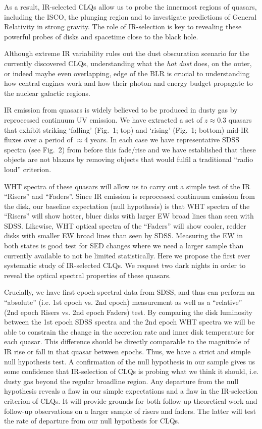 \documentclass[a4paper,fleqn,usenatbib]{mnras}
\begin{document}
As a result, IR-selected CLQs \citep{Graham2019} allow us to
probe the innermost regions of quasars, including the ISCO, the
plunging region and to investigate predictions of General Relativity
in strong gravity. The role of IR-selection is key to revealing these
powerful probes of disks and spacetime close to the black hole.

Although extreme IR variability rules out the dust obscuration
scenario for the currently discovered CLQs, understanding what the
{\it hot dust} does, on the outer, or indeed maybe even overlapping,
edge of the BLR is crucial to understanding how central engines work
and how their photon and energy budget propagate to the nuclear
galactic regions. 

IR emission from quasars is widely believed to be produced in dusty
gas by reprocessed continuum UV emission. We have extracted a set of
$z\approx 0.3$ quasars that exhibit striking `falling' (Fig.~1; top)
and `rising' (Fig.~1; bottom) mid-IR fluxes over a period of
$\approx$4 years. In each case we have representative SDSS spectra
(see Fig.~2) from before this fade/rise and we have established that
these objects are not blazars by removing objects that would fulfil a
traditional ``radio loud'' criterion.

WHT spectra of these quasars will allow us to carry out a simple test
of the IR ``Risers'' and ``Faders''. Since IR emission is reprocessed
continuum emission from the disk, our baseline expectation (null
hypothesis) is that WHT spectra of the ``Risers'' will show hotter,
bluer disks with larger EW broad lines than seen with SDSS. Likewise,
WHT optical spectra of the ``Faders'' will show cooler, redder disks
with smaller EW broad lines than seen by SDSS. Measuring the EW in
both states is good test for SED changes where we need a larger sample
than currently available to not be limited statistically. Here we
propose the first ever systematic study of IR-selected CLQs.  We
request two dark nights in order to reveal the optical spectral
properties of these quasars.

Crucially, we have first epoch spectral data from SDSS, and thus can
perform an ``absolute'' (i.e. 1st epoch vs. 2nd epoch) measurement as
well as a ``relative'' (2nd epoch Risers vs. 2nd epoch Faders)
test. By comparing the disk luminosity between the 1st epoch SDSS
spectra and the 2nd epoch WHT spectra we will be able to constrain the
change in the accretion rate and inner disk temperature for each
quasar. This difference should be directly comparable to the magnitude
of IR rise or fall in that quasar between epochs.  Thus, we have a
strict and simple null hypothesis test. A confirmation of the null
hypothesis in our sample gives us some confidence that IR-selection of
CLQs is probing what we think it should, i.e. dusty gas beyond the
regular broadline region. Any departure from the null hypothesis
reveals a flaw in our simple expectations and a flaw in the
IR-selection criterion of CLQs. It will provide grounds for both
follow-up theoretical work and follow-up observations on a larger
sample of risers and faders. The latter will test the rate of
departure from our null hypothesis for CLQs.
\end{document}
